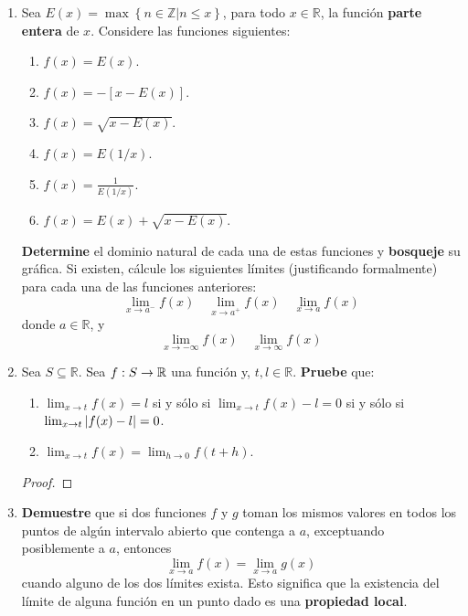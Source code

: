 \documentclass[12pt]{article}
\begin{document}
\begin{enumerate}
    \item Sea $E(x)=\max\left\{n\in\mathbb{Z}\Big|n\leq x \right\}$, para todo $x\in\mathbb{R}$, la función \textbf{parte entera} de $x$. Considere las funciones siguientes:
    \begin{enumerate}
        \item $f(x)=E(x)$.
        \item $f(x)=-[x-E(x)]$.
        \item $f(x)=\sqrt{x-E(x)}$.
        \item $f(x)=E(1/x)$.
        \item $f(x)=\frac{1}{E(1/x)}$.
        \item $f(x)=E(x)+\sqrt{x-E(x)}$.
    \end{enumerate}
    \textbf{Determine} el dominio natural de cada una de estas funciones y \textbf{bosqueje} su gráfica. Si existen, cálcule los siguientes límites (justificando formalmente) para cada una de las funciones anteriores:
    \begin{equation*}
        \lim_{ x\rightarrow a^-}f(x)\quad\lim_{ x\rightarrow a^+}f(x)\quad\lim_{ x\rightarrow a}f(x)
    \end{equation*}
    donde $a\in\mathbb{R}$, y
    \begin{equation*}
        \lim_{ x\rightarrow-\infty}f(x)\quad\lim_{ x\rightarrow\infty}f(x)
    \end{equation*}

    \begin{sol}
    \end{sol}

    \item Sea $S\subseteq\mathbb{R}$. Sea $f:S\rightarrow\mathbb{R}$ una función y, $t,l\in\mathbb{R}$. \textbf{Pruebe} que:
    \begin{enumerate}
        \item $\lim_{ x\rightarrow t}f(x)=l$ si y sólo si $\lim_{ x\rightarrow t}f(x)-l=0$ si y sólo si $\lim_{ x\rightarrow t}\left| f(x)-l \right|=0$.
        \item $\lim_{ x\rightarrow t}f(x)=\lim_{ h\rightarrow 0}f(t+h)$.
    \end{enumerate}

    \begin{proof}
    \end{proof}

    \item \textbf{Demuestre} que si dos funciones $f$ y $g$ toman los mismos valores en todos los puntos de algún intervalo abierto que contenga a $a$, exceptuando posiblemente a $a$, entonces
    \begin{equation*}
        \lim_{ x\rightarrow a}f(x)=\lim_{ x\rightarrow a}g(x)
    \end{equation*}
    cuando alguno de los dos límites exista. Esto significa que la existencia del límite de alguna función en un punto dado es una \textbf{propiedad local}.


\end{enumerate}
\end{document}
